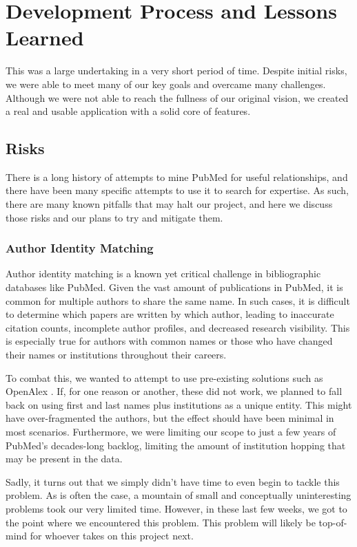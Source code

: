 \section{Development Process and Lessons Learned}

This was a large undertaking in a very short period of time. Despite initial risks, we were able to meet many of our key goals and overcame many challenges. Although we were not able to reach the fullness of our original vision, we created a real and usable application with a solid core of features.

\subsection{Risks}

There is a long history of attempts to mine PubMed for useful relationships, and there have been many specific attempts to use it to search for expertise. As such, there are many known pitfalls that may halt our project, and here we discuss those risks and our plans to try and mitigate them.

\subsubsection{Author Identity Matching}
Author identity matching is a known yet critical challenge in bibliographic databases like PubMed. Given the vast amount of publications in PubMed, it is common for multiple authors to share the same name. In such cases, it is difficult to determine which papers are written by which author, leading to inaccurate citation counts, incomplete author profiles, and decreased research visibility. This is especially true for authors with common names or those who have changed their names or institutions throughout their careers.

To combat this, we wanted to attempt to use pre-existing solutions such as OpenAlex \cite{ref-openalex}. If, for one reason or another, these did not work, we planned to fall back on using first and last names plus institutions as a unique entity. This might have over-fragmented the authors, but the effect should have been minimal in most scenarios. Furthermore, we were limiting our scope to just a few years of PubMed’s decades-long backlog, limiting the amount of institution hopping that may be present in the data.

Sadly, it turns out that we simply didn't have time to even begin to tackle this problem. As is often the case, a mountain of small and conceptually uninteresting problems took our very limited time. However, in these last few weeks, we got to the point where we encountered this problem. This problem will likely be top-of-mind for whoever takes on this project next.


